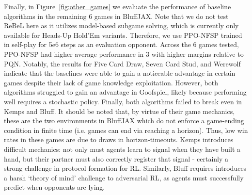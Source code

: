 Finally, in Figure~\ref{fig:other_games} we evaluate the performance of baseline algorithms in the remaining 6 games in BluffJAX. Note that we do not test ReBeL here as it utilizes model-based subgame solving, which is currently only available for Heads-Up Hold'Em variants. Therefore, we use PPO-NFSP trained in self-play for 5e6 steps as an evaluation opponent. Across the 6 games tested, PPO-NFSP had higher average performance in 3 with higher margins relative to PQN. Notably, the results for Five Card Draw, Seven Card Stud, and Werewolf indicate that the baselines were able to gain a noticeable advantage in certain games despite their lack of game knowledge exploitation. However, both algorithms struggled to gain an advantage in Goofspiel, likely because performing well requires a stochastic policy. Finally, both algorithms failed to break even in Kemps and Bluff. It should be noted that, by virtue of their game mechanics, these are the two environments in BluffJAX which do not enforce a game-ending condition in finite time (i.e. games can end via reaching a horizon). Thus, low win rates in these games are due to draws in horizon-timeouts. Kemps introduces difficult mechanics: not only must agents learn to signal when they have built a hand, but their partner must also correctly register that signal - certainly a strong challenge in protocol formation for RL. Similarly, Bluff requires introduces a harsh `theory of mind' challenge to adversarial RL, as agents must successfully predict when opponents are lying.